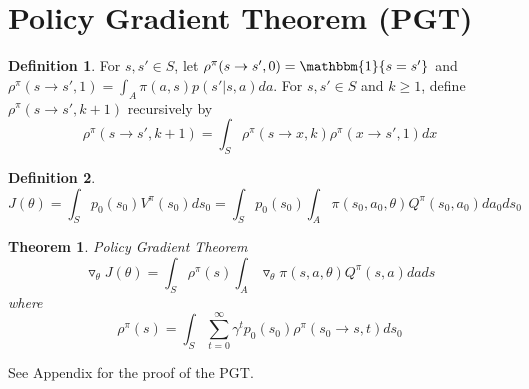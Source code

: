 \documentclass[11pt]{article}
\newtheorem{theorem}{Theorem}
\theoremstyle{definition}
\newtheorem{definition}{Definition}[section]
\begin{document}
\section{Policy Gradient Theorem (PGT)}
\begin{definition} For $s,s' \in S$, let $\rho^{\pi}(s \rightarrow s',0) = \mathbbm{1}\{s=s'\}$ and $\rho^{\pi}(s \rightarrow s',1) = \int_A \pi (a, s) p(s'|s,a) da$. For $s,s' \in S$ and $k \ge 1$, define $\rho^{\pi}(s \rightarrow s',k+1)$ recursively by
\begin{equation}
\rho^{\pi}(s \rightarrow s',k+1) = \int_S \rho^{\pi}(s \rightarrow x,k) \rho^{\pi}(x \rightarrow s',1) dx
\end{equation}
\end{definition}
\begin{definition}
\begin{equation}
J(\theta) = \int_S p_0(s_0)V^{\pi}(s_0)ds_0 = 
\int_S p_0(s_0) \int_A \pi (s_0, a_0, \theta ) Q^{\pi}(s_0,a_0) da_0 ds_0
\end{equation}
\end{definition}
\begin{theorem}
Policy Gradient Theorem
\begin{equation}
\triangledown_{\theta}J(\theta) = \int_S \rho^{\pi}(s) \int_A \triangledown_{\theta} \pi (s,a,\theta) Q^{\pi}(s,a) da ds
\end{equation}
where
\begin{equation}
\rho^{\pi}(s) = \int_S \sum_{t=0}^{\infty} \gamma^t p_0(s_0) \rho^{\pi}(s_0 \rightarrow s, t) ds_0
\end{equation}
\end{theorem}
See Appendix for the proof of the PGT.
\end{document}
